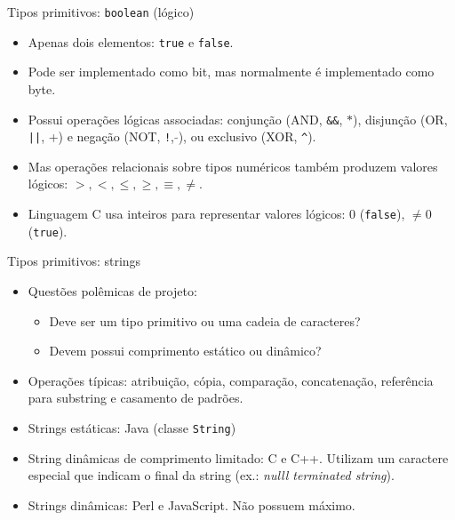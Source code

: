 \documentclass[handout]{beamer}
\begin{document}
\begin{frame}[fragile]{Tipos primitivos: \lstinline|boolean| (lógico)}

\begin{itemize}
    \item Apenas dois elementos: \lstinline|true| e \lstinline|false|.
    \item Pode ser implementado como bit, mas normalmente é implementado como byte.
    \item Possui operações lógicas associadas: conjunção (AND, \verb!&&!, $*$), disjunção (OR, \verb!||!, +) e negação (NOT, \lstinline|!|, $\tilde{{}}$), ou exclusivo (XOR, \verb|^|).
    \item Mas operações relacionais sobre tipos numéricos também produzem valores lógicos: $>, <, \leq, \geq, \equiv, \neq$.
    \item Linguagem C usa inteiros para representar valores lógicos: 0 (\lstinline|false|), $\neq 0$ (\lstinline|true|).
\end{itemize}

\end{frame}

\begin{frame}[fragile]{Tipos primitivos: strings}

\begin{itemize}
    \item Questões polêmicas de projeto:
    \begin{itemize}
        \item Deve ser um tipo primitivo ou uma cadeia de caracteres?
        \item Devem possui comprimento estático ou dinâmico?
    \end{itemize}
    \item Operações típicas: atribuição, cópia, comparação, concatenação, referência para substring e casamento de padrões.
    \item Strings estáticas: Java (classe \lstinline|String|)
    \item String dinâmicas de comprimento limitado: C e C++. Utilizam um caractere especial que indicam o final da string (ex.: \textit{nulll terminated string}).
    \item Strings dinâmicas: Perl e JavaScript. Não possuem máximo.
\end{itemize}

\end{frame}
\end{document}
